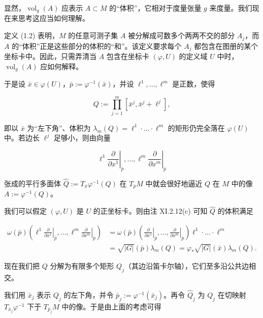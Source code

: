 显然，$ \operatorname{vol}_g(A) $ 应表示 $ A \subset M $ 的“体积”，它相对于度量张量 $ g $ 来度量。我们现在来思考这应当如何理解。

定义 (1.2) 表明，$ M $ 的任意可测子集 $ A $ 被分解成可数多个两两不交的部分 $ A_j $，而 $ A $ 的“体积”正是这些部分的体积的“和”。该定义要求每个 $ A_j $ 都包含在图册的某个坐标卡中。因此，只需弄清当 $ A $ 包含在坐标卡 $ (\varphi, U) $ 的定义域 $ U $ 中时，$ \operatorname{vol}_g(A) $ 应如何解释。

于是设 $ \bar x \in \varphi(U) $，$ \bar p := \varphi^{-1}(\bar x) $，并设 $ \ell^1, \ldots, \ell^m $ 是正数，使得

\[
Q := \prod_{j=1}^{m} [\bar x^j, \bar x^j + \ell^j] ,
\]

即以 $ \bar x $ 为“左下角”、体积为 $ \lambda_m(Q) = \ell^1 \cdot \ldots \cdot \ell^m $ 的矩形仍完全落在 $ \varphi(U) $ 中。若边长 $ \ell^j $ 足够小，则由向量

\[
\ell^1 \left.\frac{\partial}{\partial x^1}\right|_{\bar p} , \ldots , \ell^m \left.\frac{\partial}{\partial x^m}\right|_{\bar p}
\]

张成的平行多面体 $ \widehat{Q} := T_{\bar x}\varphi^{-1}(Q) $ 在 $ T_{\bar p}M $ 中就会很好地逼近 $ Q $ 在 $ M $ 中的像 $ A := \varphi^{-1}(Q) $。


我们可以假定 $ (\varphi, U) $ 是 $ U $ 的正坐标卡。则由注 XI.2.12(c) 可知 $ \widehat{Q} $ 的体积满足

\begin{equation*}
\begin{aligned}
\omega(\bar p)\left(\ell^1 \left.\frac{\partial}{\partial x^1}\right|_{\bar p}, \ldots, \ell^m \left.\frac{\partial}{\partial x^m}\right|_{\bar p}\right) &= \omega(\bar p)\left(\left.\frac{\partial}{\partial x^1}\right|_{\bar p}, \ldots, \left.\frac{\partial}{\partial x^m}\right|_{\bar p}\right)\ell^1 \cdot \ldots \cdot \ell^m \\ &= \sqrt{|G|}(\bar p)\lambda_m(Q) = \varphi_*\sqrt{|G|}(\bar x)\lambda_m(Q) .
\end{aligned}
\end{equation*}

现在我们把 $ Q $ 分解为有限多个矩形 $ Q_j $（其边沿笛卡尔轴），它们至多沿公共边相交。


我们用 $ \bar x_j $ 表示 $ Q_j $ 的左下角，并令 $ \bar p_j := \varphi^{-1}(\bar x_j) $。再令 $ \widehat{Q}_j $ 为 $ Q_j $ 在切映射 $ T_{\bar x_j}\varphi^{-1} $ 下于 $ T_{\bar p_j}M $ 中的像。于是由上面的考虑可得


